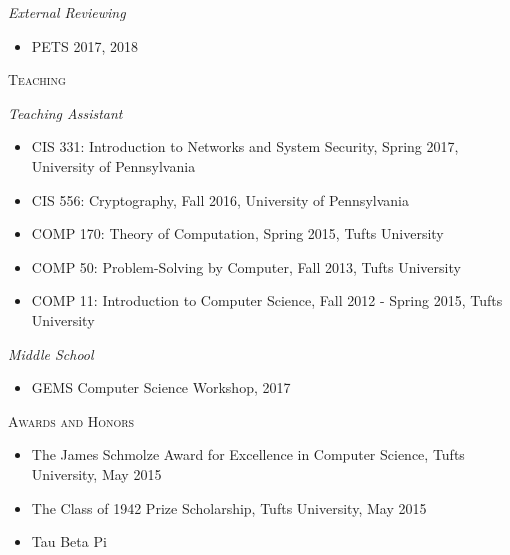\documentclass{article}
\begin{document}
\textit{External Reviewing}
\begin{itemize}[label={}]
\item PETS 2017, 2018
\end{itemize}

\textsc{Teaching}

\textit{Teaching Assistant}
\begin{itemize}[label={},noitemsep]
\item CIS 331: Introduction to Networks and System Security, Spring 2017, University of Pennsylvania
\item CIS 556: Cryptography, Fall 2016, University of Pennsylvania
\item COMP 170: Theory of Computation, Spring 2015, Tufts University
\item COMP 50: Problem-Solving by Computer, Fall 2013, Tufts University
\item COMP 11: Introduction to Computer Science, Fall 2012 - Spring 2015, Tufts University
\end{itemize}

\textit{Middle School}
\begin{itemize}[label={},noitemsep]
\item GEMS Computer Science Workshop, 2017
\end{itemize}

\textsc{Awards and Honors}
\begin{itemize}[label={}]
\item The James Schmolze Award for Excellence in Computer Science, Tufts University, May 2015
\item The Class of 1942 Prize Scholarship, Tufts University, May 2015
\item Tau Beta Pi
\end{itemize}
\end{document}
